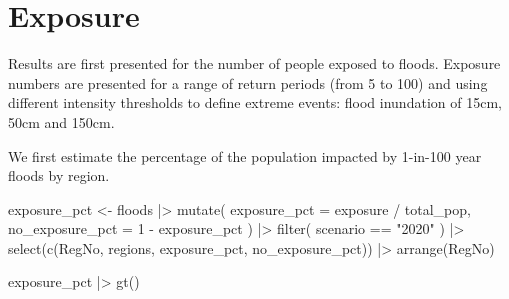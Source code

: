 \documentclass[
  letterpaper,
  DIV=11,
  numbers=noendperiod]{scrartcl}
\newenvironment{Shaded}{}{}
\newcommand{\AttributeTok}[1]{\textcolor[rgb]{0.84,0.23,0.29}{#1}}
\newcommand{\DecValTok}[1]{\textcolor[rgb]{0.00,0.36,0.77}{#1}}
\newcommand{\FunctionTok}[1]{\textcolor[rgb]{0.44,0.26,0.76}{#1}}
\newcommand{\NormalTok}[1]{\textcolor[rgb]{0.14,0.16,0.18}{#1}}
\newcommand{\OtherTok}[1]{\textcolor[rgb]{0.44,0.26,0.76}{#1}}
\newcommand{\SpecialCharTok}[1]{\textcolor[rgb]{0.00,0.36,0.77}{#1}}
\newcommand{\StringTok}[1]{\textcolor[rgb]{0.01,0.18,0.38}{#1}}
\begin{document}
\section{Exposure}\label{exposure}

Results are first presented for the number of people exposed to floods.
Exposure numbers are presented for a range of return periods (from 5 to
100) and using different intensity thresholds to define extreme events:
flood inundation of 15cm, 50cm and 150cm.

We first estimate the percentage of the population impacted by 1-in-100
year floods by region.

\begin{Shaded}
\begin{Highlighting}[]
\NormalTok{exposure\_pct }\OtherTok{\textless{}{-}}\NormalTok{ floods }\SpecialCharTok{|\textgreater{}} 
  \FunctionTok{mutate}\NormalTok{(}
    \AttributeTok{exposure\_pct =}\NormalTok{ exposure }\SpecialCharTok{/}\NormalTok{ total\_pop,}
    \AttributeTok{no\_exposure\_pct =} \DecValTok{1} \SpecialCharTok{{-}}\NormalTok{ exposure\_pct}
\NormalTok{  ) }\SpecialCharTok{|\textgreater{}} 
  \FunctionTok{filter}\NormalTok{(}
\NormalTok{    scenario }\SpecialCharTok{==} \StringTok{"2020"}
\NormalTok{  ) }\SpecialCharTok{|\textgreater{}} 
  \FunctionTok{select}\NormalTok{(}\FunctionTok{c}\NormalTok{(RegNo, regions, exposure\_pct, no\_exposure\_pct)) }\SpecialCharTok{|\textgreater{}} 
  \FunctionTok{arrange}\NormalTok{(RegNo)}

\NormalTok{exposure\_pct }\SpecialCharTok{|\textgreater{}} 
  \FunctionTok{gt}\NormalTok{()}
\end{Highlighting}
\end{Shaded}
\end{document}
